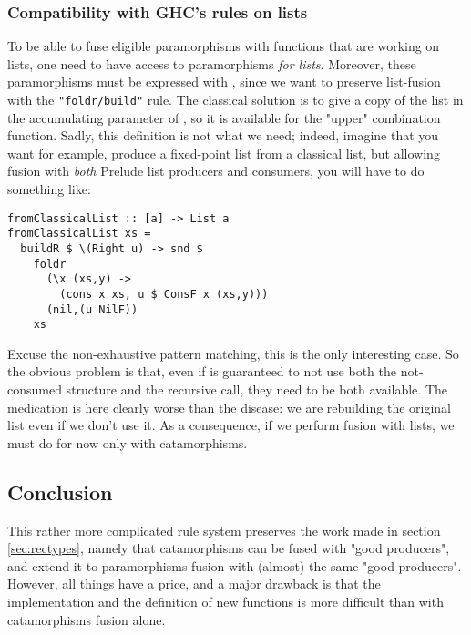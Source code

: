 \subsubsection{Compatibility with GHC's rules on lists}
\label{sec:parabuild}
To be able to fuse eligible paramorphisms with functions that are working on lists, one need to have access to paramorphisms \emph{for lists}. Moreover, these paramorphisms must be expressed with , since we want to preserve list-fusion with the \verb|"foldr/build"| rule. The classical solution is to give a copy of the list in the accumulating parameter of , so it is available for the "upper" combination function. Sadly, this definition is not what we need; indeed, imagine that you want for example, produce a fixed-point list from a classical list, but allowing fusion with \emph{both} Prelude list producers and  consumers, you will have to do something like:
\begin{verbatim}
fromClassicalList :: [a] -> List a
fromClassicalList xs =
  buildR $ \(Right u) -> snd $
    foldr
      (\x (xs,y) ->
        (cons x xs, u $ ConsF x (xs,y)))
      (nil,(u NilF))
    xs
\end{verbatim}
Excuse the non-exhaustive pattern matching, this is the only interesting case. So the obvious problem is that, even if  is guaranteed to not use both the not-consumed structure and the recursive call, they need to be both available. The medication is here clearly worse than the disease: we are rebuilding the original list even if we don't use it. As a consequence, if we perform fusion with lists, we must do for now only with catamorphisms.

\subsection{Conclusion}
This rather more complicated rule system preserves the work made in section \ref{sec:rectypes}, namely that catamorphisms can be fused with "good producers", and extend it to paramorphisms fusion with (almost) the same "good producers". However, all things have a price, and a major drawback is that the implementation and the definition of new functions is more difficult than with catamorphisms fusion alone.